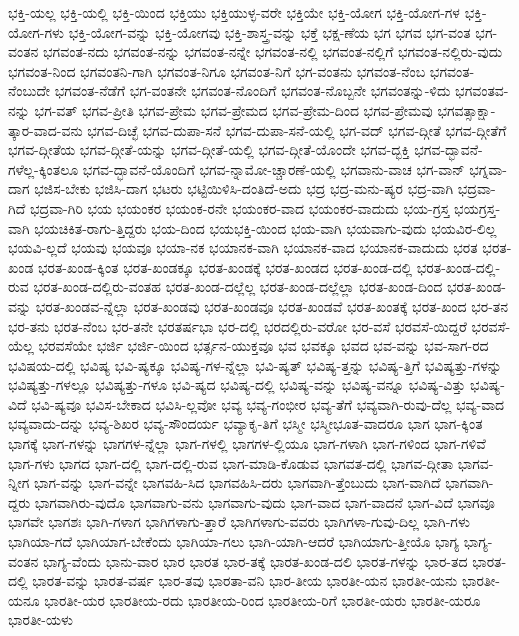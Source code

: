 {ಭಕ್ತಿ-ಯಲ್ಲ
ಭಕ್ತಿ-ಯಲ್ಲಿ
ಭಕ್ತಿ-ಯಿಂದ
ಭಕ್ತಿಯು
ಭಕ್ತಿಯುಳ್ಳ-ವರೇ
ಭಕ್ತಿಯೇ
ಭಕ್ತಿ-ಯೋಗ
ಭಕ್ತಿ-ಯೋಗ-ಗಳ
ಭಕ್ತಿ-ಯೋಗ-ಗಳು
ಭಕ್ತಿ-ಯೋಗ-ವನ್ನು
ಭಕ್ತಿ-ಯೋಗವು
ಭಕ್ತಿ-ಶಾಸ್ತ್ರ-ವನ್ನು
ಭಕ್ತೆ
ಭಕ್ಷ-ಣೆಯ
ಭಗ
ಭಗವ
ಭಗ-ವಂತ
ಭಗ-ವಂತನ
ಭಗವಂತ-ನದು
ಭಗವಂತ-ನನ್ನು
ಭಗವಂತ-ನನ್ನೇ
ಭಗವಂತ-ನಲ್ಲಿ
ಭಗವಂತ-ನಲ್ಲಿಗೆ
ಭಗವಂತ-ನಲ್ಲಿರು-ವುದು
ಭಗವಂತ-ನಿಂದ
ಭಗವಂತನಿ-ಗಾಗಿ
ಭಗವಂತ-ನಿಗೂ
ಭಗವಂತ-ನಿಗೆ
ಭಗ-ವಂತನು
ಭಗವಂತ-ನೆಂಬ
ಭಗವಂತ-ನೆಂಬುದೇ
ಭಗವಂತ-ನೆಡೆಗೆ
ಭಗ-ವಂತನೇ
ಭಗವಂತ-ನೊಂದಿಗೆ
ಭಗವಂತ-ನೊಬ್ಬನೇ
ಭಗವಂತನ್ನು-ಳಿದು
ಭಗವಂತವ-ನನ್ನು
ಭಗ-ವತ್
ಭಗವ-ಪ್ರೀತಿ
ಭಗವ-ಪ್ರೇಮ
ಭಗವ-ಪ್ರೇಮದ
ಭಗವ-ಪ್ರೇಮ-ದಿಂದ
ಭಗವ-ಪ್ರೇಮವು
ಭಗವತ್ಸಾಕ್ಷಾ-ತ್ಕಾರ-ವಾದ-ವನು
ಭಗವ-ದಿಚ್ಛೆ
ಭಗವ-ದುಪಾ-ಸನೆ
ಭಗವ-ದುಪಾ-ಸನೆ-ಯಲ್ಲಿ
ಭಗ-ವದ್
ಭಗವ-ದ್ಗೀತೆ
ಭಗವ-ದ್ಗೀತೆಗೆ
ಭಗವ-ದ್ಗೀತೆಯ
ಭಗವ-ದ್ಗೀತೆ-ಯನ್ನು
ಭಗವ-ದ್ಗೀತೆ-ಯಲ್ಲಿ
ಭಗವ-ದ್ಗೀತೆ-ಯೊಂದೇ
ಭಗವ-ದ್ಭಕ್ತಿ
ಭಗವ-ದ್ಭಾವನೆ-ಗಳೆಲ್ಲ-ಕ್ಕಿಂತಲೂ
ಭಗವ-ದ್ಭಾವನೆ-ಯೊಂದಿಗೆ
ಭಗವ-ನ್ನಾಮೋ-ಚ್ಚಾರಣೆ-ಯಲ್ಲಿ
ಭಗವಾನು-ವಾಚ
ಭಗ-ವಾನ್
ಭಗ್ನವಾ-ದಾಗ
ಭಜಿಸ-ಬೇಕು
ಭಜಿಸಿ-ದಾಗ
ಭಟರು
ಭಟ್ಟಿಯಿಳಿಸಿ-ದಂತಿದೆ-ಅದು
ಭದ್ರ
ಭದ್ರ-ಮನು-ಷ್ಯರ
ಭದ್ರ-ವಾಗಿ
ಭದ್ರವಾ-ಗಿದೆ
ಭದ್ರವಾ-ಗಿರಿ
ಭಯ
ಭಯಂಕರ
ಭಯಂಕ-ರನೇ
ಭಯಂಕರ-ವಾದ
ಭಯಂಕರ-ವಾದುದು
ಭಯ-ಗ್ರಸ್ತ
ಭಯಗ್ರಸ್ತ-ವಾಗಿ
ಭಯಚಿಕಿತ-ರಾಗು-ತ್ತಿದ್ದರು
ಭಯ-ದಿಂದ
ಭಯಭಕ್ತಿ-ಯಿಂದ
ಭಯ-ವಾಗಿ
ಭಯವಾಗು-ವುದು
ಭಯವಿರ-ಲಿಲ್ಲ
ಭಯವಿ-ಲ್ಲದೆ
ಭಯವು
ಭಯವೂ
ಭಯಾ-ನಕ
ಭಯಾನಕ-ವಾಗಿ
ಭಯಾನಕ-ವಾದ
ಭಯಾನಕ-ವಾದುದು
ಭರತ
ಭರತ-ಖಂಡ
ಭರತ-ಖಂಡ-ಕ್ಕಿಂತ
ಭರತ-ಖಂಡಕ್ಕೂ
ಭರತ-ಖಂಡಕ್ಕೆ
ಭರತ-ಖಂಡದ
ಭರತ-ಖಂಡ-ದಲ್ಲಿ
ಭರತ-ಖಂಡ-ದಲ್ಲಿ-ರುವ
ಭರತ-ಖಂಡ-ದಲ್ಲಿರು-ವಂತಹ
ಭರತ-ಖಂಡ-ದಲ್ಲೆಲ್ಲ
ಭರತ-ಖಂಡ-ದಲ್ಲೆಲ್ಲಾ
ಭರತ-ಖಂಡ-ದಿಂದ
ಭರತ-ಖಂಡ-ವನ್ನು
ಭರತ-ಖಂಡವ-ನ್ನೆಲ್ಲಾ
ಭರತ-ಖಂಡವು
ಭರತ-ಖಂಡವೂ
ಭರತ-ಖಂಡವೆ
ಭರತ-ಖಂತಕ್ಕೆ
ಭರತ-ಖಂದ
ಭರ-ತನ
ಭರ-ತನು
ಭರತ-ನೆಂಬ
ಭರ-ತನೇ
ಭರತರ್ಷಭಾ
ಭರ-ದಲ್ಲಿ
ಭರದಲ್ಲಿರು-ವರೋ
ಭರ-ವಸೆ
ಭರವಸೆ-ಯಿದ್ದರೆ
ಭರವಸೆ-ಯೆಲ್ಲ
ಭರವಸೆಯೇ
ಭರ್ಜಿ
ಭರ್ಜಿ-ಯಿಂದ
ಭರ್ತ್ಸನ-ಯುಕ್ತವೂ
ಭವ
ಭವಕ್ಕೂ
ಭವದ
ಭವ-ವನ್ನು
ಭವ-ಸಾಗ-ರದ
ಭವಿಷಯ-ದಲ್ಲಿ
ಭವಿಷ್ಯ
ಭವಿ-ಷ್ಯಕ್ಕೂ
ಭವಿಷ್ಯ-ಗಳ-ನ್ನೆಲ್ಲಾ
ಭವಿ-ಷ್ಯತ್
ಭವಿಷ್ಯ-ತ್ತನ್ನು
ಭವಿಷ್ಯ-ತ್ತಿಗೆ
ಭವಿಷ್ಯತ್ತು-ಗಳನ್ನು
ಭವಿಷ್ಯತ್ತು-ಗಳಲ್ಲೂ
ಭವಿಷ್ಯತ್ತು-ಗಳೂ
ಭವಿ-ಷ್ಯದ
ಭವಿಷ್ಯ-ದಲ್ಲಿ
ಭವಿಷ್ಯ-ವನ್ನು
ಭವಿಷ್ಯ-ವನ್ನೂ
ಭವಿಷ್ಯ-ವಿತ್ತು
ಭವಿಷ್ಯ-ವಿದೆ
ಭವಿ-ಷ್ಯವೂ
ಭವಿಸ-ಬೇಕಾದ
ಭವಿಸಿ-ಲ್ಲವೋ
ಭವ್ಯ
ಭವ್ಯ-ಗಂಭೀರ
ಭವ್ಯ-ತೆಗೆ
ಭವ್ಯವಾಗಿ-ರುವು-ದೆಲ್ಲ
ಭವ್ಯ-ವಾದ
ಭವ್ಯವಾದು-ದನ್ನು
ಭವ್ಯ-ಶಿಖರ
ಭವ್ಯ-ಸೌಂದರ್ಯ
ಭವ್ಯಾಕೃ-ತಿಗೆ
ಭಸ್ಮೀ
ಭಸ್ಮೀಭೂತ-ವಾದರೂ
ಭಾಗ
ಭಾಗ-ಕ್ಕಿಂತ
ಭಾಗಕ್ಕೆ
ಭಾಗ-ಗಳನ್ನು
ಭಾಗಗಳ-ನ್ನೆಲ್ಲಾ
ಭಾಗ-ಗಳಲ್ಲಿ
ಭಾಗಗಳ-ಲ್ಲಿಯೂ
ಭಾಗ-ಗಳಾಗಿ
ಭಾಗ-ಗಳಿಂದ
ಭಾಗ-ಗಳಿವೆ
ಭಾಗ-ಗಳು
ಭಾಗದ
ಭಾಗ-ದಲ್ಲಿ
ಭಾಗ-ದಲ್ಲಿ-ರುವ
ಭಾಗ-ಮಾಡಿ-ಕೊಡುವ
ಭಾಗವತ-ದಲ್ಲಿ
ಭಾಗವ-ದ್ಗೀತಾ
ಭಾಗವ-ನ್ನೀಗ
ಭಾಗ-ವನ್ನು
ಭಾಗ-ವನ್ನೇ
ಭಾಗವಹಿ-ಸಿದ
ಭಾಗವಹಿಸಿ-ದರು
ಭಾಗವಾಗಿ-ತ್ತೆಂಬುದು
ಭಾಗ-ವಾಗಿದೆ
ಭಾಗವಾಗಿ-ದ್ದರು
ಭಾಗವಾಗಿರು-ವುದೊ
ಭಾಗವಾಗು-ವನು
ಭಾಗವಾಗು-ವುದು
ಭಾಗ-ವಾದ
ಭಾಗ-ವಾದನೆ
ಭಾಗ-ವಿದೆ
ಭಾಗವೂ
ಭಾಗವೇ
ಭಾಗಶಃ
ಭಾಗಿ-ಗಳಾಗ
ಭಾಗಿಗಳಾಗು-ತ್ತಾರೆ
ಭಾಗಿಗಳಾಗು-ವವರು
ಭಾಗಿಗಳಾ-ಗುವು-ದಿಲ್ಲ
ಭಾಗಿ-ಗಳು
ಭಾಗಿಯಾ-ಗದೆ
ಭಾಗಿಯಾಗ-ಬೇಕೆಂದು
ಭಾಗಿಯಾ-ಗಲು
ಭಾಗಿ-ಯಾಗಿ-ಆದರೆ
ಭಾಗಿಯಾಗು-ತ್ತೀಯೊ
ಭಾಗ್ಯ
ಭಾಗ್ಯ-ವಂತನ
ಭಾಗ್ಯ-ವೆಂದು
ಭಾನು-ವಾರ
ಭಾರ
ಭಾರತ
ಭಾರ-ತಕ್ಕೆ
ಭಾರತ-ಖಂಡ-ದಲಿ
ಭಾರತ-ಗಳನ್ನು
ಭಾರ-ತದ
ಭಾರತ-ದಲ್ಲಿ
ಭಾರತ-ವನ್ನು
ಭಾರತ-ವರ್ಷ
ಭಾರ-ತವು
ಭಾರತಾ-ವನಿ
ಭಾರ-ತೀಯ
ಭಾರತೀ-ಯನ
ಭಾರತೀ-ಯನು
ಭಾರತೀ-ಯನೂ
ಭಾರತೀ-ಯರ
ಭಾರತೀಯ-ರದು
ಭಾರತೀಯ-ರಿಂದ
ಭಾರತೀಯ-ರಿಗೆ
ಭಾರತೀ-ಯರು
ಭಾರತೀ-ಯರೂ
ಭಾರತೀ-ಯಳು
}
